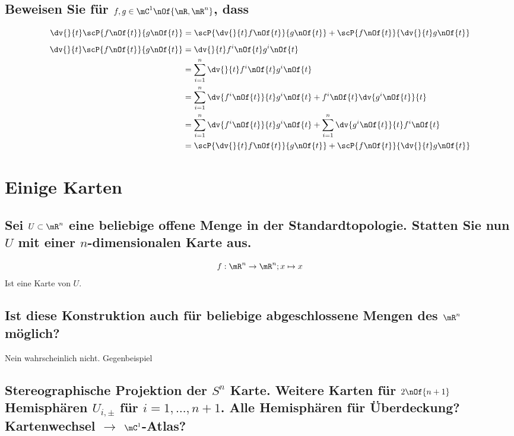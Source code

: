 \documentclass[11pt,a4paper]{scrartcl}
\begin{document}
	\subsection{Beweisen Sie für $f, g \in \mC^1\nOf{\mR,\mR^n}$, dass}
	\begin{equation}
		\dv{}{t} \scP{f\nOf{t}}{g\nOf{t}} = \scP{\dv{}{t}f\nOf{t}}{g\nOf{t}} + \scP{f\nOf{t}}{\dv{}{t}g\nOf{t}}
	\end{equation}
	\begin{align}
		\dv{}{t} \scP{f\nOf{t}}{g\nOf{t}} & = \dv{}{t} f^i\nOf{t} g^i\nOf{t} \\
		& = \sum\limits_{i=1}^n \dv{}{t} f^i\nOf{t} g^i\nOf{t} \\
		& = \sum\limits_{i=1}^n \dv{f^i\nOf{t}}{t} g^i\nOf{t} + f^i\nOf{t} \dv{g^i\nOf{t}}{t} \\
		& = \sum\limits_{i=1}^n \dv{f^i\nOf{t}}{t} g^i\nOf{t} + \sum\limits_{i=1}^n \dv{g^i\nOf{t}}{t} f^i\nOf{t} \\
		& = \scP{\dv{}{t}f\nOf{t}}{g\nOf{t}} + \scP{f\nOf{t}}{\dv{}{t}g\nOf{t}}
	\end{align}
	\section{Einige Karten}
	\subsection{Sei $U \subset \mR^n$ eine beliebige offene Menge in der Standardtopologie. Statten Sie nun $U$ mit einer $n$-dimensionalen Karte aus.}
	\begin{equation}
		f : \mR^n \to \mR^n; x \mapsto x
	\end{equation}
	Ist eine Karte von $U$.
	\subsection{Ist diese Konstruktion auch für beliebige abgeschlossene Mengen des $\mR^n$ möglich?}
	Nein wahrscheinlich nicht. Gegenbeispiel
	\subsection{Stereographische Projektion der $S^n$ Karte. Weitere Karten für $2\nOf{n+1}$ Hemisphären $U_{i,\pm}$ für $i = 1,\dots,n+1$. Alle Hemisphären für Überdeckung? Kartenwechsel $\rightarrow$ $\mC^1$-Atlas?}
\end{document}
